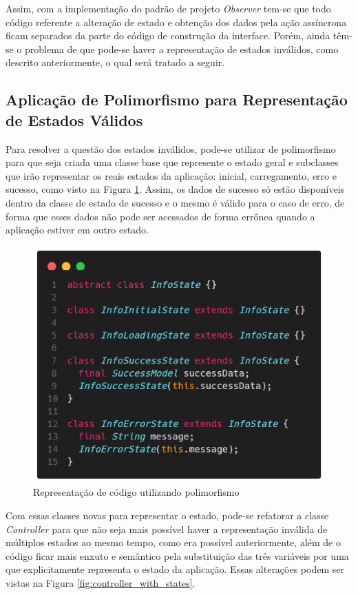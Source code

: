 \documentclass[12pt, %
openright, 
oneside, %
a4paper,    %
brazil]{facom-ufu-abntex2}
\begin{document}
Assim, com a implementação do padrão de projeto \textit{Observer} tem-se que todo código referente a alteração de estado e obtenção dos dados pela ação assíncrona ficam separados da parte do código de construção da interface. Porém, ainda têm-se o problema de que pode-se haver a representação de estados inválidos, como descrito anteriormente, o qual será tratado a seguir.

\subsection{Aplicação de Polimorfismo para Representação de Estados Válidos}

Para resolver a questão dos estados inválidos, pode-se utilizar de polimorfismo para que seja criada uma classe base que represente o estado geral e subclasses que irão representar os reais estados da aplicação: inicial, carregamento, erro e sucesso, como visto na Figura \ref{fig:states}. Assim, os dados de sucesso só estão disponíveis dentro da classe de estado de sucesso e o mesmo é válido para o caso de erro, de forma que esses dados não pode ser acessados de forma errônea quando a aplicação estiver em outro estado.

\begin{figure}[ht]
    \centering
    \includegraphics[width=.65\textwidth, trim={0 30 0 100}, clip]{figures/states/states.png}
    \caption{Representação de código utilizando polimorfismo}
    \label{fig:states}
\end{figure}

Com essas classes novas para representar o estado, pode-se refatorar a classe \textit{Controller} para que não seja mais possível haver a representação inválida de múltiplos estados ao mesmo tempo, como era possível anteriormente, além de o código ficar mais enxuto e semântico pela substituição das três variáveis por uma que explicitamente representa o estado da aplicação. Essas alterações podem ser vistas na Figura \ref{fig:controller_with_states}.
\end{document}
